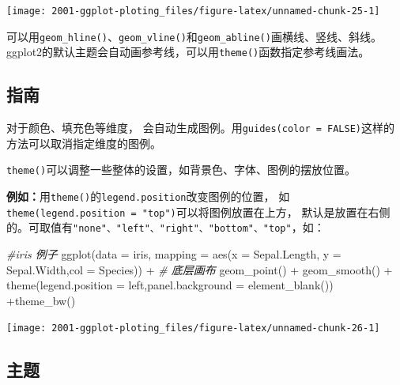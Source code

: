 \documentclass[
]{book}
\newenvironment{Shaded}{\begin{snugshade}}{\end{snugshade}}
\newcommand{\AttributeTok}[1]{\textcolor[rgb]{0.77,0.63,0.00}{#1}}
\newcommand{\CommentTok}[1]{\textcolor[rgb]{0.56,0.35,0.01}{\textit{#1}}}
\newcommand{\FunctionTok}[1]{\textcolor[rgb]{0.00,0.00,0.00}{#1}}
\newcommand{\NormalTok}[1]{#1}
\newcommand{\SpecialCharTok}[1]{\textcolor[rgb]{0.00,0.00,0.00}{#1}}
\newcommand{\StringTok}[1]{\textcolor[rgb]{0.31,0.60,0.02}{#1}}
\begin{document}
\begin{center}\texttt{[image: 2001-ggplot-ploting\_files/figure-latex/unnamed-chunk-25-1]} \end{center}

可以用\texttt{geom\_hline()}、\texttt{geom\_vline()}和\texttt{geom\_abline()}画横线、竖线、斜线。
ggplot2的默认主题会自动画参考线，可以用\texttt{theme()}函数指定参考线画法。

\hypertarget{ux6307ux5357}{%
\subsection{指南}\label{ux6307ux5357}}

对于颜色、填充色等维度，
会自动生成图例。用\texttt{guides(color\ =\ FALSE)}这样的方法可以取消指定维度的图例。

\texttt{theme()}可以调整一些整体的设置，如背景色、字体、图例的摆放位置。

\textbf{例如：}用\texttt{theme()}的\texttt{legend.position}改变图例的位置，
如\texttt{theme(legend.position\ =\ "top")}可以将图例放置在上方，
默认是放置在右侧的。可取值有\texttt{"none"、"left"、"right"、"bottom"、"top"}，如：

\begin{Shaded}
\begin{Highlighting}[]
\CommentTok{\#iris 例子}
\FunctionTok{ggplot}\NormalTok{(}\AttributeTok{data =}\NormalTok{ iris, }\AttributeTok{mapping =} \FunctionTok{aes}\NormalTok{(}\AttributeTok{x =}\NormalTok{ Sepal.Length, }\AttributeTok{y =}\NormalTok{ Sepal.Width,}\AttributeTok{col =}\NormalTok{ Species)) }\SpecialCharTok{+}  \CommentTok{\# 底层画布}
  \FunctionTok{geom\_point}\NormalTok{() }\SpecialCharTok{+}
  \FunctionTok{geom\_smooth}\NormalTok{() }\SpecialCharTok{+}
  \FunctionTok{theme}\NormalTok{(}\AttributeTok{legend.position =} \StringTok{\textquotesingle{}left\textquotesingle{}}\NormalTok{,}\AttributeTok{panel.background =} \FunctionTok{element\_blank}\NormalTok{()) }\SpecialCharTok{+}\FunctionTok{theme\_bw}\NormalTok{()}
\end{Highlighting}
\end{Shaded}

\begin{center}\texttt{[image: 2001-ggplot-ploting\_files/figure-latex/unnamed-chunk-26-1]} \end{center}

\hypertarget{ux4e3bux9898}{%
\subsection{主题}\label{ux4e3bux9898}}
\end{document}
